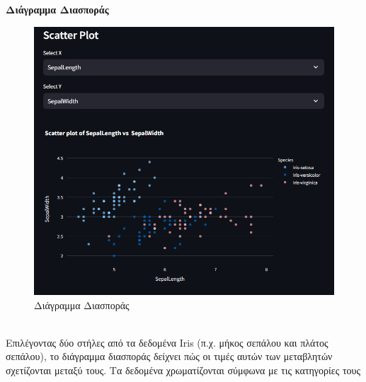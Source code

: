 \documentclass{article}
\begin{document}
{{{{{{\textbf{Διάγραμμα Διασποράς}
\begin{figure}[h!]
  \centering
  \includegraphics[width=0.6\textheight]{photos/scatter_plot.png}
  \caption{Διάγραμμα Διασποράς}
  \label{fig:ScatterPlot}
\end{figure}
\\ \vspace{0.3 cm}
Επιλέγοντας δύο στήλες από τα δεδομένα Iris (π.χ. μήκος σεπάλου και πλάτος σεπάλου), το διάγραμμα διασποράς δείχνει πώς οι τιμές αυτών των μεταβλητών σχετίζονται μεταξύ τους. Τα δεδομένα χρωματίζονται σύμφωνα με τις κατηγορίες τους
\newpage
}}}}}}
\end{document}
